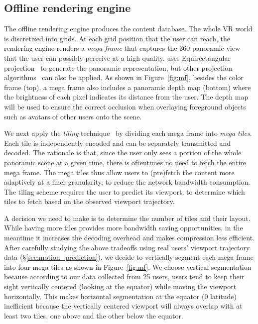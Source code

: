 \subsection{Offline rendering engine}
The offline rendering engine produces the content database.
%
The whole VR world is discretized into grids. At each grid position that the user can reach, the rendering engine renders a \emph{mega frame} that captures the 360\degree{} panoramic view that the user can possibly perceive at a high quality. \firefly uses Equirectangular projection~\cite{equirectangular} to generate the panoramic representation, but other projection algorithms~\cite{pyramid,cubemap,yu2015framework} can also be applied. As shown in Figure~\ref{fig:mf}, besides the color frame (top), a mega frame also includes a panoramic depth map (bottom) where the brightness of each pixel indicates its distance from the user. The depth map will be used to ensure the correct occlusion when overlaying foreground objects such as avatars of other users onto the scene. %

We next apply the \emph{tiling} technique~\cite{qian2018flare,he2018rubiks} by dividing each mega frame into \emph{mega tiles}. Each tile is independently encoded and can be separately transmitted and decoded.
%
The rationale is that, since the user only sees a portion of the whole panoramic scene at a given time, there is oftentimes no need to fetch the entire mega frame. The mega tiles thus allow users to (pre)fetch the content more adaptively at a finer granularity, to reduce the network bandwidth consumption.
%
The tiling scheme requires the user to predict its viewport, \ie to determine which tiles to fetch based on the observed viewport trajectory.

A decision we need to make is to determine the number of tiles and their layout.
While having more tiles provides more bandwidth saving opportunities, in the meantime it increases the decoding overhead %
and makes compression less efficient.
After carefully studying the above tradeoffs using real users' viewport trajectory data (\S\ref{sec:motion_prediction}), we decide to vertically segment each mega frame into four mega tiles as shown in Figure~\ref{fig:mf}. We choose vertical segmentation because according to our data collected from 25 users,
users tend to keep their sight vertically centered (\ie looking at the equator) while moving the viewport horizontally.
%
This makes horizontal segmentation at the equator (0\degree{} latitude) inefficient because the vertically centered viewport will always overlap with at least two tiles, \ie one above and the other below the equator.

